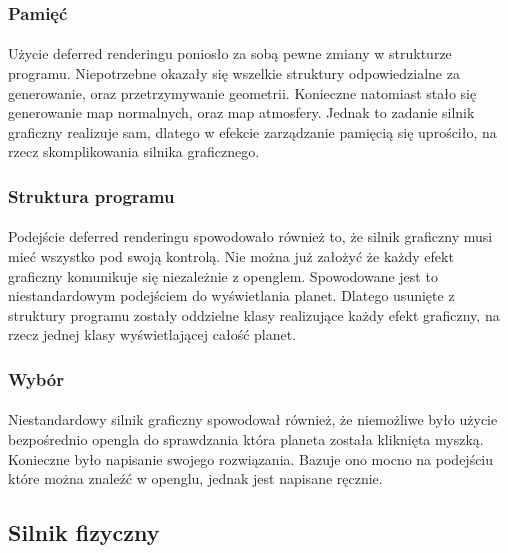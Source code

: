 \subsubsection{Pamięć}\label{ssub:pamiec}
\paragraph{}

Użycie deferred renderingu poniosło za sobą pewne zmiany w strukturze programu. Niepotrzebne okazały się wszelkie struktury odpowiedzialne za generowanie, oraz przetrzymywanie geometrii. Konieczne natomiast stało się generowanie map normalnych, oraz map atmosfery. Jednak to zadanie silnik graficzny realizuje sam, dlatego w efekcie zarządzanie pamięcią się uprościło, na rzecz skomplikowania silnika graficznego.

\subsubsection{Struktura programu}\label{ssub:struktura programu}
\paragraph{}

Podejście deferred renderingu spowodowało również to, że silnik graficzny musi mieć wszystko pod swoją kontrolą. Nie można już założyć że każdy efekt graficzny komunikuje się niezależnie z openglem. Spowodowane jest to niestandardowym podejściem do wyświetlania planet. Dlatego usunięte z struktury programu zostały oddzielne klasy realizujące każdy efekt graficzny, na rzecz jednej klasy wyświetlającej całość planet.

\subsubsection{Wybór}\label{ssub:klikanie}
\paragraph{}

Niestandardowy silnik graficzny spowodował również, że niemożliwe było użycie bezpośrednio opengla do sprawdzania która planeta została kliknięta myszką. Konieczne było napisanie swojego rozwiązania. Bazuje ono mocno na podejściu które można znaleźć w openglu, jednak jest napisane ręcznie.

\subsection{Silnik fizyczny}\label{sub:silnik fizyczny}
